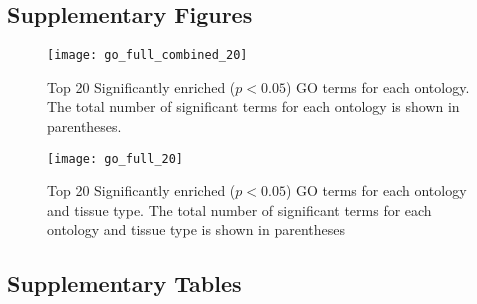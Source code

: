 \documentclass[11pt]{article}
\begin{document}
\subsection*{Supplementary Figures}\label{ss:supp-fig}

\begin{figure}[t]
  \centering
  \texttt{[image: go\_full\_combined\_20]}
  \caption{Top 20 Significantly enriched ($p < 0.05$) GO terms for
    each ontology. The total number of significant terms for each
    ontology is shown in parentheses.}
  \label{fig:go_combined}
\end{figure}


\begin{figure}[t]
  \centering
  \texttt{[image: go\_full\_20]}
  \caption{Top 20 Significantly enriched ($p < 0.05$) GO terms for
    each ontology and tissue type. The total number of significant
    terms for each ontology and tissue type is shown in parentheses}
  \label{fig:go_tissue}
\end{figure}
 
\clearpage

\subsection*{Supplementary Tables}\label{ss:supp-tab}
\scriptsize
  
\clearpage

\clearpage

\clearpage
  
\clearpage

\clearpage

\end{document}
